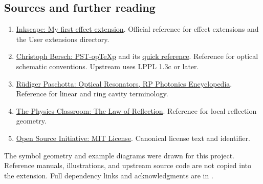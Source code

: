 \documentclass[11pt,a4paper]{article}
\newcommand{\filepath}[1]{\texttt{\detokenize{#1}}}
\begin{document}
\subsection*{Sources and further reading}
\begin{enumerate}[itemsep=5pt]
\item \href{https://inkscape.gitlab.io/extensions/documentation/tutorial/my-first-effect-extension.html}{Inkscape: My first effect extension}. Official reference for effect extensions and the User extensions directory.
\item \href{https://ctan.org/pkg/pst-optexp}{Christoph Bersch: PST-opTeXp} and its \href{https://mirrors.mit.edu/CTAN/graphics/pstricks/contrib/pst-optexp/pst-optexp-quickref.pdf}{quick reference}. Reference for optical schematic conventions. Upstream uses LPPL 1.3c or later.
\item \href{https://www.rp-photonics.com/optical_resonators.html}{Rüdiger Paschotta: Optical Resonators, RP Photonics Encyclopedia}. Reference for linear and ring cavity terminology.
\item \href{https://www.physicsclassroom.com/mmedia/optics/lr.cfm}{The Physics Classroom: The Law of Reflection}. Reference for local reflection geometry.
\item \href{https://opensource.org/license/mit}{Open Source Initiative: MIT License}. Canonical license text and identifier.
\end{enumerate}
The symbol geometry and example diagrams were drawn for this project. Reference manuals, illustrations, and upstream source code are not copied into the extension. Full dependency links and acknowledgments are in \filepath{THIRD_PARTY_NOTICES.md}.
\end{document}
